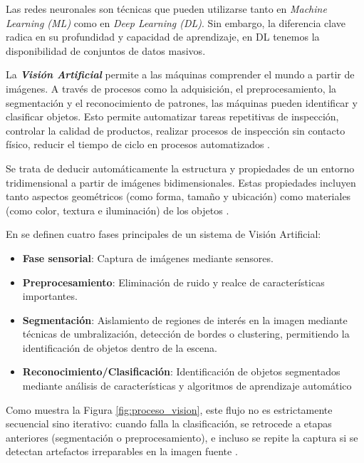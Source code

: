 
Las redes neuronales son técnicas que pueden utilizarse tanto en \textit{Machine Learning (ML)} como en \textit{Deep Learning (DL)}. Sin embargo, la diferencia clave radica en su profundidad y capacidad de aprendizaje, en DL tenemos la disponibilidad de conjuntos de datos masivos.

La \textbf{\textit{Visión Artificial}} permite a las máquinas comprender el mundo a partir de imágenes. A través de procesos como la adquisición, el preprocesamiento, la segmentación y el reconocimiento de patrones, las máquinas pueden identificar y clasificar objetos. Esto permite automatizar tareas repetitivas de inspección, controlar la calidad de productos, realizar procesos de inspección sin contacto físico, reducir el tiempo de ciclo en procesos automatizados \cite{visionartificial}.

Se trata de deducir automáticamente la estructura y propiedades de un entorno tridimensional a partir de imágenes bidimensionales. Estas propiedades incluyen tanto aspectos geométricos (como forma, tamaño y ubicación) como materiales (como color, textura e iluminación) de los objetos \cite{visionartificialunirioja}. 

En \cite{visionporcomputador} se definen cuatro fases principales de un sistema de Visión Artificial:
\begin{itemize}
    \item \textbf{Fase sensorial}: Captura de imágenes mediante sensores.
    \item \textbf{Preprocesamiento}: Eliminación de ruido y realce de características importantes.
    \item \textbf{Segmentación}: Aislamiento de regiones de interés en la imagen mediante técnicas de umbralización, detección de bordes o clustering, permitiendo la identificación de objetos dentro de la escena.
    \item \textbf{Reconocimiento/Clasificación}: Identificación de objetos segmentados mediante análisis de características y algoritmos de aprendizaje automático
\end{itemize}

Como muestra la Figura \ref{fig:proceso_vision}, este flujo no es estrictamente secuencial sino iterativo: cuando falla la clasificación, se retrocede a etapas anteriores (segmentación o preprocesamiento), e incluso se repite la captura si se detectan artefactos irreparables en la imagen fuente \cite{visionporcomputador}.

